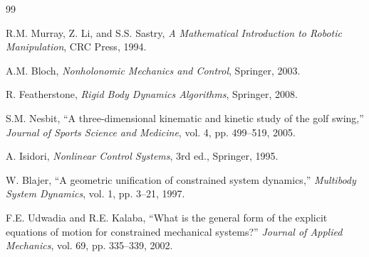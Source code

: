 \documentclass[11pt,a4paper]{article}
\theoremstyle{definition}
\begin{document}
\begin{thebibliography}{99}

R.M. Murray, Z. Li, and S.S. Sastry, \emph{A Mathematical Introduction to Robotic Manipulation}, CRC Press, 1994.

A.M. Bloch, \emph{Nonholonomic Mechanics and Control}, Springer, 2003.

R. Featherstone, \emph{Rigid Body Dynamics Algorithms}, Springer, 2008.

S.M. Nesbit, ``A three-dimensional kinematic and kinetic study of the golf swing,'' \emph{Journal of Sports Science and Medicine}, vol. 4, pp. 499--519, 2005.

A. Isidori, \emph{Nonlinear Control Systems}, 3rd ed., Springer, 1995.

W. Blajer, ``A geometric unification of constrained system dynamics,'' \emph{Multibody System Dynamics}, vol. 1, pp. 3--21, 1997.

F.E. Udwadia and R.E. Kalaba, ``What is the general form of the explicit equations of motion for constrained mechanical systems?'' \emph{Journal of Applied Mechanics}, vol. 69, pp. 335--339, 2002.

\end{thebibliography}
\end{document}
